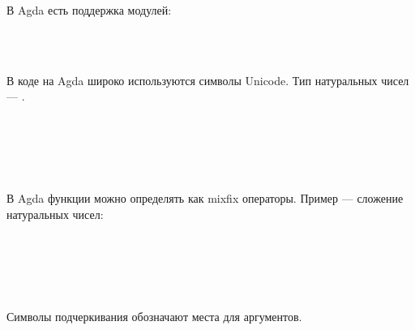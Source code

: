В Agda есть поддержка модулей:
\begin{code}\>\<%
\\
\>  \<%
\\
\>\<\end{code} В коде на Agda широко используются символы Unicode.
Тип натуральных чисел — .
\begin{code}\>\<%
\\
\>  \AgdaSymbol{:}  \<%
\\
\>[0]\<[2]%
\>[2] \AgdaSymbol{:} \<%
\\
\>[0]\<[2]%
\>[2] \AgdaSymbol{:}   \<%
\\
\>\<\end{code} 
В Agda функции можно определять как mixfix операторы.
Пример — сложение натуральных чисел:
\begin{code}\>\<%
\\
\>\AgdaFunction{\_+\_} \AgdaSymbol{:}     \<%
\\
\> \AgdaFunction{+}  \AgdaSymbol{=} \<%
\\
\>  \AgdaFunction{+}  \AgdaSymbol{=}  \AgdaSymbol{(} \AgdaFunction{+} \AgdaSymbol{)}\<%
\\
\>\<\end{code}
Символы подчеркивания обозначают места для аргументов.

